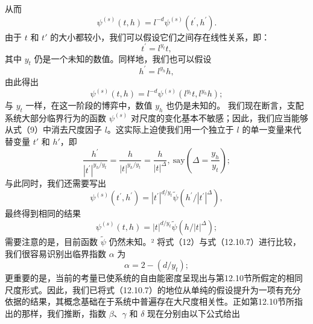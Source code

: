 从而
\begin{equation}\tag{14.1.6}\label{eq:14.1.6}
\psi ^{( s )} ( t , h ) = l ^{- d} \psi ^{( s )} ( t ^{\prime} , h ^{\prime} ) .
\end{equation}
由于 \(t\) 和 \(t'\) 的大小都较小，我们可以假设它们之间存在线性关系，即：
\begin{equation}\tag{14.1.7}\label{eq:14.1.7}
t ^{\prime} = l ^{y _ { t} } t ,
\end{equation}
其中 \(y_{t}\) 仍是一个未知的数值。同样地，我们也可以假设
\begin{equation}\tag{14.1.8}\label{eq:14.1.8}
h ^{\prime} = l ^{y _ { h} } h ,
\end{equation}
由此得出
\begin{equation}\tag{14.1.9}\label{eq:14.1.9}
\psi ^{( s )} ( t , h ) = l ^{- d} \psi ^{( s )} ( l ^{y _ { t} } t , l ^{y _ { h} } h ) ;
\end{equation}
与 \(y_t\) 一样，在这一阶段的博弈中，数值 \(y_h\) 也仍是未知的。
我们现在断言，支配系统大部分临界行为的函数 \(\psi^{(s)}\) 对尺度的变化基本不敏感；因此，我们应当能够从式（9）中消去尺度因子 \(l\)。这实际上迫使我们用一个独立于 \(l\) 的单一变量来代替变量 \(t'\) 和 \(h'\)，即
\begin{equation}\tag{14.1.10}\label{eq:14.1.10}
\frac { h ^{\prime} } { | t ^{\prime} | ^{y _ { h} / y _ { t } } } = \frac { h } { | t | ^{y _ { h} / y _ { t } } } = \frac { h } { | t | ^{\Delta} } , \mathrm { ~ s a y }  \left( \Delta = \frac { y _ { h } } { y _ { t } } \right) ;
\end{equation}
与此同时，我们还需要写出
\begin{equation}\tag{14.1.11}\label{eq:14.1.11}
\psi ^{( s )} ( t ^{\prime} , h ^{\prime} ) = | t ^{\prime} | ^{d / y _ { t} } \tilde { \psi } \left( h ^{\prime} / | t ^{\prime} | ^{\Delta} \right) ,
\end{equation}
最终得到相同的结果
\begin{equation}\tag{14.1.12}\label{eq:14.1.12}
\psi ^{( s )} ( t , h ) = | t | ^{d / y _ { t} } \tilde { \psi } \left( h / | t | ^{\Delta} \right) ;
\end{equation}
需要注意的是，目前函数 \(\tilde{\psi}\) 仍然未知。² 将式（12）与式（12.10.7）进行比较，我们很容易识别出临界指数 \(\alpha\) 为
\begin{equation}\tag{14.1.13}\label{eq:14.1.13}
\alpha = 2 - ( d / y _ { t } ) ;
\end{equation}
更重要的是，当前的考量已使系统的自由能密度呈现出与第12.10节所假定的相同尺度形式。因此，我们已将式（12.10.7）的地位从单纯的假设提升为一项有充分依据的结果，其概念基础在于系统中普遍存在大尺度相关性。正如第12.10节所指出的那样，我们推断，指数 \(\beta\)、\(\gamma\) 和 \(\delta\) 现在分别由以下公式给出
